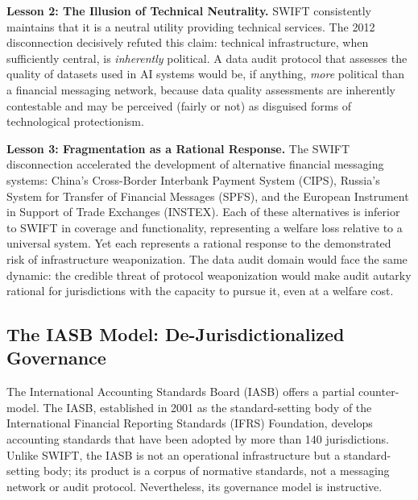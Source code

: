 \documentclass[12pt,a4paper]{article}
\theoremstyle{definition}
\theoremstyle{remark}
\begin{document}
\textbf{Lesson 2: The Illusion of Technical Neutrality.} SWIFT consistently maintains that it is a neutral utility providing technical services. The 2012 disconnection decisively refuted this claim: technical infrastructure, when sufficiently central, is \textit{inherently} political. A data audit protocol that assesses the quality of datasets used in AI systems would be, if anything, \textit{more} political than a financial messaging network, because data quality assessments are inherently contestable and may be perceived (fairly or not) as disguised forms of technological protectionism.

\textbf{Lesson 3: Fragmentation as a Rational Response.} The SWIFT disconnection accelerated the development of alternative financial messaging systems: China's Cross-Border Interbank Payment System (CIPS), Russia's System for Transfer of Financial Messages (SPFS), and the European Instrument in Support of Trade Exchanges (INSTEX). Each of these alternatives is inferior to SWIFT in coverage and functionality, representing a welfare loss relative to a universal system. Yet each represents a rational response to the demonstrated risk of infrastructure weaponization. The data audit domain would face the same dynamic: the credible threat of protocol weaponization would make audit autarky rational for jurisdictions with the capacity to pursue it, even at a welfare cost.

\subsection{The IASB Model: De-Jurisdictionalized Governance}

The International Accounting Standards Board (IASB) offers a partial counter-model. The IASB, established in 2001 as the standard-setting body of the International Financial Reporting Standards (IFRS) Foundation, develops accounting standards that have been adopted by more than 140 jurisdictions. Unlike SWIFT, the IASB is not an operational infrastructure but a standard-setting body; its product is a corpus of normative standards, not a messaging network or audit protocol. Nevertheless, its governance model is instructive.
\end{document}
